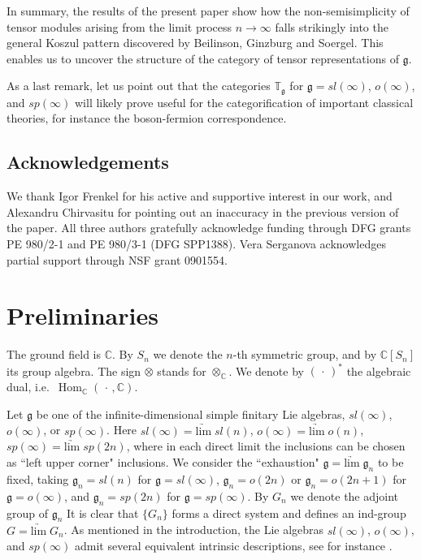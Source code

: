 \documentclass{amsart}
\renewcommand{\sl}{sl}
\newcommand{\so}{o}
\newcommand{\Tg}{\mathbb T_{\mathfrak g}}
\renewcommand{\sp}{sp}
\renewcommand{\gg}{\mathfrak{g}}
\newcommand{\CC}{\mathbb{C}}
\newcommand{\limarr}{\underrightarrow{\mathrm{lim}} \;}
\newcommand{\Hom}{\operatorname{Hom}}
\theoremstyle{definition}
\numberwithin{equation}{section}
\begin{document}
In summary, the results of the present paper show how the
non-semisimplicity of tensor 
modules arising from the limit process $n\rightarrow\infty$ falls strikingly into the general Koszul pattern discovered by Beilinson, Ginzburg and Soergel.  This enables us to uncover the structure of the category of tensor representations of $\gg$.

As a last remark, let us point out that the categories $\Tg$ for $\gg= \sl(\infty)$, $\so(\infty)$, and
$\sp(\infty)$ will likely prove useful for the categorification
of important classical theories, for instance the
boson-fermion correspondence. 

\subsection*{Acknowledgements}
We thank Igor Frenkel for his active and supportive interest in our
work, and Alexandru Chirvasitu for pointing out an inaccuracy in the
previous version of the paper.
All three authors gratefully acknowledge funding through DFG grants PE 980/2-1 and PE 980/3-1 (DFG SPP1388).  Vera Serganova acknowledges partial support through NSF grant 0901554.


\section{Preliminaries} \label{prelim}

The ground field is $\CC$.   By $S_n$ we denote the $n$-th symmetric group, and by $\CC[S_n]$ its group algebra.  The sign $\otimes$ stands for $\otimes_\CC$.  We denote by $(\, \cdot \,)^*$ the algebraic dual, i.e.\ $\Hom_{\CC} (\, \cdot \,, \CC)$.

Let $\gg$ be one of the infinite-dimensional simple finitary Lie algebras, $\sl(\infty)$, $\so(\infty)$, or $\sp(\infty)$.  Here $\sl(\infty)=\limarr \sl(n)$, $\so(\infty)=\limarr \so(n)$, $\sp(\infty)=\limarr \sp(2n)$, where in each direct limit the inclusions can be chosen as ``left upper corner" inclusions.  We consider the ``exhaustion" $\gg = \limarr \gg_n$ to be fixed, taking $\gg_n = \sl(n)$ for $\gg = \sl(\infty)$, $\gg_n = \so(2n)$ or $\gg_n = \so(2n+1)$ for $\gg = \so(\infty)$, and $\gg_n = \sp(2n)$ for $\gg = \sp(\infty)$.  By $G_n$ we denote the adjoint group of $\gg_n$  It is clear that $\{ G_n \}$ forms a direct system and defines an ind-group $G = \limarr G_n$.  As mentioned in the introduction, the Lie algebras $\sl(\infty)$, $\so(\infty)$, and $\sp(\infty)$ admit several equivalent intrinsic descriptions, see for instance \cite{B, BSt, PStr}.  
\end{document}
